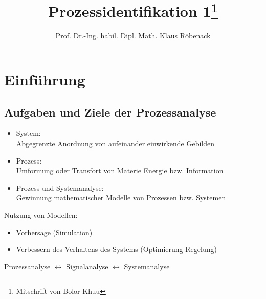 \documentclass[ngerman]{tudscrreprt}
\begin{document}
 \department{}   \title{Prozessidentifikation 1{\footnote{Mitschrift von Bolor Khuu}}
}

\author{Prof. Dr.-Ing. habil. Dipl. Math. Klaus Röbenack}
\maketitle
\tableofcontents
\newpage
\chapter{Einführung}
	\section{Aufgaben und Ziele der Prozessanalyse}
	\begin{itemize}
	\item System:\\Abgegrenzte Anordnung von aufeinander einwirkende Gebilden
	\item Prozess:\\Umformung oder Transfort von Materie Energie bzw. Information
	\item Prozess und Systemanalyse:\\Gewinnung mathematischer Modelle von Prozessen bzw. Systemen
	\end{itemize}
	Nutzung von Modellen:
	\begin{itemize}
	\item Vorhersage (Simulation)
	\item Verbessern des Verhaltens des Systems (Optimierung Regelung)
	\end{itemize}


	Prozessanalyse $\leftrightarrow$ Signalanalyse $\leftrightarrow$ Systemanalyse\\
\end{document}
